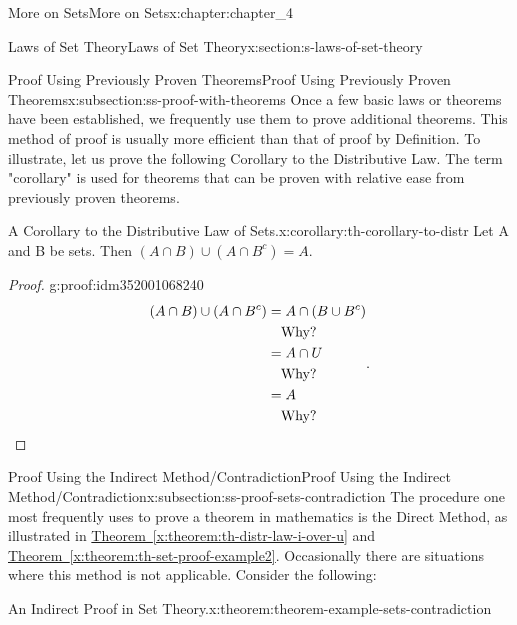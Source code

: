 \documentclass[oneside,10pt,]{book}
\newcommand{\xreffont}{\relax}
\newcommand{\qedhere}{\relax}
\begin{document}
\begin{chapterptx}{More on Sets}{}{More on Sets}{}{}{x:chapter:chapter_4}
\begin{sectionptx}{Laws of Set Theory}{}{Laws of Set Theory}{}{}{x:section:s-laws-of-set-theory}
\typeout{************************************************}
%
\begin{subsectionptx}{Proof Using Previously Proven Theorems}{}{Proof Using Previously Proven Theorems}{}{}{x:subsection:ss-proof-with-theorems}
Once a few basic laws or theorems have been established, we frequently use them to prove additional theorems. This method of proof is usually more efficient than that of proof by Definition. To illustrate, let us prove the following Corollary to the Distributive Law.   The term "corollary" is used for theorems that can be proven with relative ease from previously proven theorems.%
\begin{corollary}{A Corollary to the Distributive Law of Sets.}{}{x:corollary:th-corollary-to-distr}%
Let A and B be sets. Then \((A\cap  B) \cup  (A\cap  B^c) = A\).%
\end{corollary}
\begin{proof}{}{g:proof:idm352001068240}
%
\begin{equation*}
\begin{split}
(A\cap  B) \cup  (A\cap  B^c) & = A \cap (B \cup B^c)\\
& \quad \textrm{Why?}\\
& = A \cap U\\ 
&\quad  \textrm{Why?}\\
& = A\\
&\quad \textrm{Why?} 
\end{split}\text{.}\qedhere
\end{equation*}
%
\end{proof}
\end{subsectionptx}
%
%
\typeout{************************************************}
\typeout{************************************************}
%
\begin{subsectionptx}{Proof Using the Indirect Method\slash{}Contradiction}{}{Proof Using the Indirect Method\slash{}Contradiction}{}{}{x:subsection:ss-proof-sets-contradiction}
The procedure one most frequently uses to prove a theorem in mathematics is the Direct Method, as illustrated in \hyperref[x:theorem:th-distr-law-i-over-u]{Theorem~{\xreffont\ref{x:theorem:th-distr-law-i-over-u}}} and \hyperref[x:theorem:th-set-proof-example2]{Theorem~{\xreffont\ref{x:theorem:th-set-proof-example2}}}. Occasionally there are situations where this method is not applicable. Consider the following:%
\begin{theorem}{An Indirect Proof in Set Theory.}{}{x:theorem:theorem-example-sets-contradiction}%

\end{theorem}
\end{subsectionptx}
\end{sectionptx}
\end{chapterptx}
\end{document}
